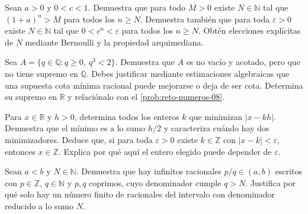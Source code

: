 \begin{samepage}
\begin{problem}\label{prob:reto-distribucion-08}
Sean $a>0$ y $0<c<1$. Demuestra que para todo $M>0$ existe $N\in\mathbb N$ tal que $(1+a)^n>M$ para todos los $n\ge N$. Demuestra también que para toda $\varepsilon>0$ existe $N\in\mathbb N$ tal que $0<c^n<\varepsilon$ para todos los $n\ge N$. Obtén elecciones explícitas de $N$ mediante Bernoulli y la propiedad arquimediana.
\end{problem}
\end{samepage}
\par{}

\begin{samepage}
\begin{problem}\label{prob:reto-distribucion-09}
Sea $A=\{q\in\mathbb Q:q\ge0,\ q^3<2\}$. Demuestra que $A$ es no vacío y acotado, pero que no tiene supremo en $\mathbb Q$. Debes justificar mediante estimaciones algebraicas que una supuesta cota mínima racional puede mejorarse o deja de ser cota. Determina su supremo en $\mathbb R$ y relaciónalo con el \cref{prob:reto-numeros-08}.
\end{problem}
\end{samepage}
\par{}

\begin{samepage}
\begin{problem}\label{prob:reto-distribucion-10}
Para $x\in\mathbb R$ y $h>0$, determina todos los enteros $k$ que minimizan $|x-kh|$. Demuestra que el mínimo es a lo sumo $h/2$ y caracteriza cuándo hay dos minimizadores. Deduce que, si para toda $\varepsilon>0$ existe $k\in\mathbb Z$ con $|x-k|<\varepsilon$, entonces $x\in\mathbb Z$. Explica por qué aquí el entero elegido puede depender de $\varepsilon$.
\end{problem}
\end{samepage}
\par{}

\begin{samepage}
\begin{problem}\label{prob:reto-densidad-01}
Sean $a<b$ y $N\in\mathbb N$. Demuestra que hay infinitos racionales $p/q\in(a,b)$ escritos con $p\in\mathbb Z$, $q\in\mathbb N$ y $p,q$ coprimos, cuyo denominador cumple $q>N$. Justifica por qué solo hay un número finito de racionales del intervalo con denominador reducido a lo sumo $N$.
\end{problem}
\end{samepage}
\par{}

